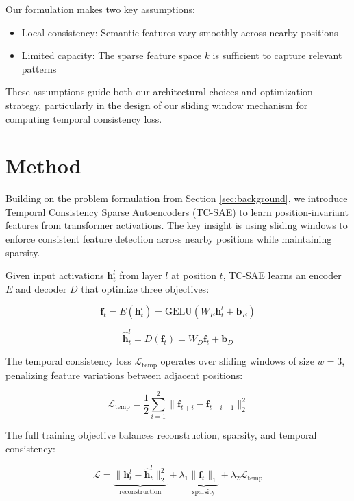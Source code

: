 \documentclass{article} %
\begin{document}
Our formulation makes two key assumptions:
\begin{itemize}
    \item Local consistency: Semantic features vary smoothly across nearby positions
    \item Limited capacity: The sparse feature space $k$ is sufficient to capture relevant patterns
\end{itemize}

These assumptions guide both our architectural choices and optimization strategy, particularly in the design of our sliding window mechanism for computing temporal consistency loss.

\section{Method}
\label{sec:method}

Building on the problem formulation from Section \ref{sec:background}, we introduce Temporal Consistency Sparse Autoencoders (TC-SAE) to learn position-invariant features from transformer activations. The key insight is using sliding windows to enforce consistent feature detection across nearby positions while maintaining sparsity.

Given input activations $\mathbf{h}_t^l$ from layer $l$ at position $t$, TC-SAE learns an encoder $E$ and decoder $D$ that optimize three objectives:

\begin{equation}
    \mathbf{f}_t = E(\mathbf{h}_t^l) = \text{GELU}(W_E\mathbf{h}_t^l + \mathbf{b}_E)
\end{equation}

\begin{equation}
    \hat{\mathbf{h}}_t^l = D(\mathbf{f}_t) = W_D\mathbf{f}_t + \mathbf{b}_D
\end{equation}

The temporal consistency loss $\mathcal{L}_{\text{temp}}$ operates over sliding windows of size $w=3$, penalizing feature variations between adjacent positions:

\begin{equation}
    \mathcal{L}_{\text{temp}} = \frac{1}{2}\sum_{i=1}^{2}\|\mathbf{f}_{t+i} - \mathbf{f}_{t+i-1}\|_2^2
\end{equation}

The full training objective balances reconstruction, sparsity, and temporal consistency:

\begin{equation}
    \mathcal{L} = \underbrace{\|\mathbf{h}_t^l - \hat{\mathbf{h}}_t^l\|_2^2}_{\text{reconstruction}} + \lambda_1\underbrace{\|\mathbf{f}_t\|_1}_{\text{sparsity}} + \lambda_2\mathcal{L}_{\text{temp}}
\end{equation}
\end{document}
